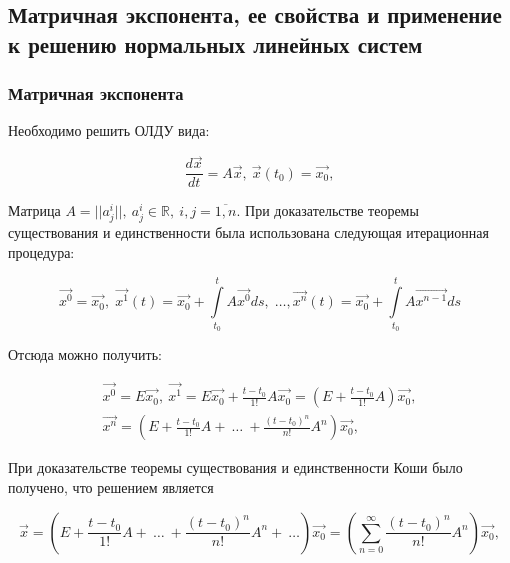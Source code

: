 \subsection{Матричная экспонента, ее свойства и применение к решению нормальных линейных систем}

\subsubsection{Матричная экспонента}
Необходимо решить ОЛДУ вида:

\begin{equation}
  	\frac{d\overrightarrow{x}}{dt} = A\overrightarrow{x},\ \overrightarrow{x}(t_0) = \overrightarrow{x_0},
  	\label{Issue5_1}
\end{equation}

Матрица $A = ||a_j^i||,\ a_j^i \in \mathds{R},\ i, j = \overline{1,n}$. При доказательстве теоремы существования и единственности была использована следующая итерационная процедура:

\begin{equation*}
	\overrightarrow{x^{0}} = \overrightarrow{x_{0}}, \; \overrightarrow{x^{1}}(t) = \overrightarrow{x_{0}} + \int \limits_{t_0}^{t} A \overrightarrow{x^{0}} ds, \; \dots, \overrightarrow{x^{n}}(t) = \overrightarrow{x_{0}} + \int \limits_{t_0}^{t} A \overrightarrow{x^{n - 1}} ds
\end{equation*}

Отсюда можно получить:

\begin{equation*}
\begin{gathered}
         \overrightarrow{x^{0}} = E\overrightarrow{x_0},\ \overrightarrow{x^1} = E\overrightarrow{x_0} + \frac{t-t_0}{1!}A\overrightarrow{x_0} = \left(E + \frac{t-t_0}{1!}A\right) \overrightarrow{x_0}, \\  
         \overrightarrow{x^n} = \left(E + \frac{t-t_0}{1!}A +\ \dots\ + \frac{(t-t_0)^n}{n!}A^n\right)\overrightarrow{x_0},	 
\end{gathered}
\end{equation*}

При доказательстве теоремы существования и единственности Коши было получено, что решением является

\begin{equation*}
   	\overrightarrow{x} = \left(E + \frac{t-t_0}{1!}A +\ \dots\ + \frac{(t-t_0)^n}{n!}A^n+\ \dots \right)\overrightarrow{x_0} = \left(\sum\limits_{n = 0}^{\infty} \frac{(t-t_0)^n}{n!}A^n\right)\overrightarrow{x_0},	 
\end{equation*}

